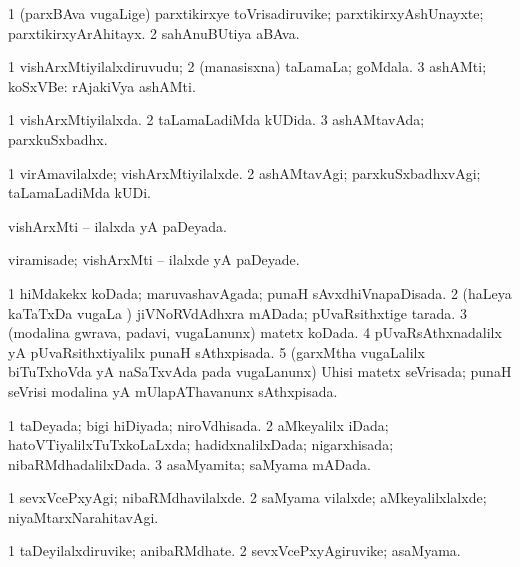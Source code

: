 \bentry
{} 
\gl{\nA}
\expl{}
\bmng
\bnum
\num{1} (parxBAva \mo vugaLige) parxtikirxye toVrisadiruvike; parxtikirxyAshUnayxte; parxtikirxyArAhitayx. 
\num{2} sahAnuBUtiya aBAva. 
\enum
\emng
\eentry

\bentry
{} 
\gl{\nA}
\expl{}
\bmng
\bnum
\num{1} vishArxMtiyilalxdiruvudu; 
\num{2} (manasisxna) taLamaLa; goMdala. 
\num{3} ashAMti; koSxVBe:  rAjakiVya ashAMti. 
\enum
\emng
\eentry

\bentry
{} 
\gl{\gu}
\expl{}
\bmng
\bnum
\num{1} vishArxMtiyilalxda. 
\num{2} taLamaLadiMda kUDida. 
\num{3} ashAMtavAda; parxkuSxbadhx. 
\enum
\emng
\eentry

\bentry
{} 
\gl{\kirxvi}
\expl{}
\bmng
\bnum
\num{1} virAmavilalxde; vishArxMtiyilalxde. 
\num{2} ashAMtavAgi; parxkuSxbadhxvAgi; taLamaLadiMda kUDi. 
\enum
\emng
\eentry

\bentry
{} 
\gl{\gu}
\expl{}
\bmng
vishArxMti -- ilalxda yA paDeyada. 
\emng
\eentry

\bentry
{} 
\gl{\kirxvi}
\expl{}
\bmng
viramisade; vishArxMti -- ilalxde yA paDeyade. 
\emng
\eentry

\bentry
{} 
\gl{\gu}
\expl{}
\bmng
\bnum
\num{1} hiMdakekx koDada; maruvashavAgada; punaH sAvxdhiVnapaDisada. 
\num{2} (haLeya kaTaTxDa \mo vugaLa \vi) jiVNoRVdAdhxra mADada; pUvaRsithxtige tarada. 
\num{3} (modalina gwrava, padavi, \mo vugaLanunx) matetx koDada. 
\num{4} pUvaRsAthxnadalilx yA pUvaRsithxtiyalilx punaH sAthxpisada. 
\num{5} (garxMtha \mo vugaLalilx biTuTxhoVda yA naSaTxvAda pada \mo vugaLanunx) Uhisi matetx seVrisada; punaH seVrisi modalina yA mUlapAThavanunx sAthxpisada. 
\enum
\emng
\eentry

\bentry
{} 
\gl{\gu}
\expl{}
\bmng
\bnum
\num{1} taDeyada; bigi hiDiyada; niroVdhisada. 
\num{2} aMkeyalilx iDada; hatoVTiyalilxTuTxkoLaLxda; hadidxnalilxDada; nigarxhisada; nibaRMdhadalilxDada. 
\num{3} asaMyamita; saMyama mADada. 
\enum
\emng
\eentry

\bentry
{} 
\gl{\kirxvi}
\expl{}
\bmng
\bnum
\num{1} sevxVcePxyAgi; nibaRMdhavilalxde. 
\num{2} saMyama vilalxde; aMkeyalilxlalxde; niyaMtarxNarahitavAgi. 
\enum
\emng
\eentry

\bentry
{} 
\gl{\nA}
\expl{}
\bmng
\bnum
\num{1} taDeyilalxdiruvike; anibaRMdhate. 
\num{2} sevxVcePxyAgiruvike; asaMyama. 
\enum
\emng
\eentry

